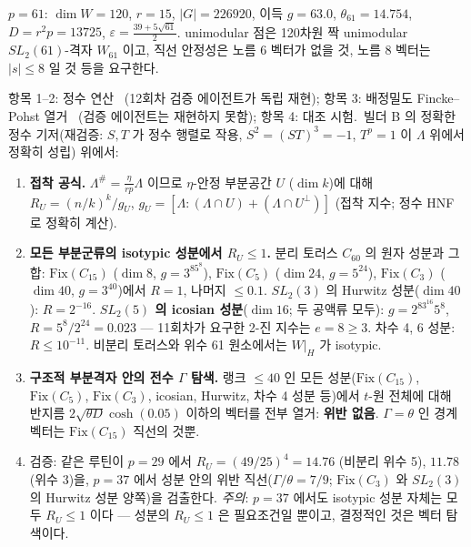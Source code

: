 $p=61$: $\dim W=120$, $r=15$, $|G|=226920$, 이득 $g=63.0$, $\theta_{61}=14.754$, $D=r^2p=13725$, $\varepsilon=\tfrac{39+5\sqrt{61}}2$. unimodular 점은 120차원 짝 unimodular $SL_2(61)$-격자 $W_{61}$ 이고, 직선 안정성은 노름 6 벡터가 없을 것, 노름 8 벡터는 $|s|\le8$ 일 것 등을 요구한다.

\begin{observation}\label{obs:p61}항목 1--2: 정수 연산 \tagPC\ (12회차 검증 에이전트가 독립 재현); 항목 3: 배정밀도 Fincke--Pohst 열거 \tagN\ (검증 에이전트는 재현하지 못함); 항목 4: 대조 시험.\
빌더 B 의 정확한 정수 기저(재검증: $S,T$ 가 정수 행렬로 작용, $S^2=(ST)^3=-1$, $T^p=1$ 이 $\Lambda$ 위에서 정확히 성립) 위에서:
\begin{enumerate}
\item \textbf{접착 공식.} $\Lambda^\#=\tfrac{\eta}{rp}\Lambda$ 이므로 $\eta$-안정 부분공간 $U$ ($\dim k$)에 대해 $R_U=(n/k)^k/g_U$, $g_U=[\Lambda:(\Lambda\cap U)+(\Lambda\cap U^\perp)]$ (접착 지수; 정수 HNF 로 정확히 계산).
\item \textbf{모든 부분군류의 isotypic 성분에서 $R_U\le1$.} 분리 토러스 $C_{60}$ 의 원자 성분과 그 합: $\mathrm{Fix}(C_{15})$ ($\dim8$, $g=3^85^8$), $\mathrm{Fix}(C_5)$ ($\dim24$, $g=5^{24}$), $\mathrm{Fix}(C_3)$ ($\dim40$, $g=3^{40}$)에서 $R=1$, 나머지 $\le0.1$. $SL_2(3)$ 의 Hurwitz 성분($\dim40$): $R=2^{-16}$. \textbf{$SL_2(5)$ 의 icosian 성분}($\dim16$; 두 공액류 모두): $g=2^83^{16}5^8$, $R=5^8/2^{24}=0.023$ --- 11회차가 요구한 2-진 지수는 $e=8\ge3$. 차수 4, 6 성분: $R\le10^{-11}$. 비분리 토러스와 위수 61 원소에서는 $W|_H$ 가 isotypic.
\item \textbf{구조적 부분격자 안의 전수 $\Gamma$ 탐색.} 랭크 $\le40$ 인 모든 성분($\mathrm{Fix}(C_{15})$, $\mathrm{Fix}(C_5)$, $\mathrm{Fix}(C_3)$, icosian, Hurwitz, 차수 4 성분 등)에서 $t$-원 전체에 대해 반지름 $2\sqrt{\theta D}\cosh(0.05)$ 이하의 벡터를 전부 열거: \textbf{위반 없음}. $\Gamma=\theta$ 인 경계 벡터는 $\mathrm{Fix}(C_{15})$ 직선의 것뿐.
\item 검증: 같은 루틴이 $p=29$ 에서 $R_U=(49/25)^4=14.76$ (비분리 위수 5), $11.78$ (위수 3)을, $p=37$ 에서 성분 안의 위반 직선($\Gamma/\theta=7/9$; $\mathrm{Fix}(C_3)$ 와 $SL_2(3)$ 의 Hurwitz 성분 양쪽)을 검출한다. \emph{주의}: $p=37$ 에서도 isotypic 성분 자체는 모두 $R_U\le1$ 이다 --- 성분의 $R_U\le1$ 은 필요조건일 뿐이고, 결정적인 것은 벡터 탐색이다.
\end{enumerate}
\end{observation}

